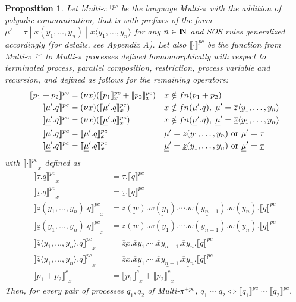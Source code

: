 \documentclass[submission,copyright,creativecommons]{eptcs}
\newcommand{\nat}{{\rm I\!N}}
\newcommand{\restr}[1]{\mbox{$({\bf\nu} #1)$}}
\newcommand{\encoding}[2]{\ensuremath{\llbracket #2 \rrbracket^{#1}}}
\newtheorem{aproposition}[adefinition]{Proposition}
\newenvironment{proposition}{\begin{aproposition}}{\end{aproposition}}
\begin{document}
\begin{proposition} Let Multi-$\pi^{+pc}$ be the language Multi-$\pi$ with the addition
of polyadic communication, that is with prefixes of the form 
$ \mu' = \tau \;|\; x(y_1, \ldots, y_n) \;|\; \overline x \langle y_1, \ldots, y_n \rangle $ for any $n \in \nat$ and SOS rules generalized accordingly (for details, see Appendix A). Let also $\encoding {pc} { \cdot }$ be the function from Multi-$\pi^{+pc}$ to Multi-$\pi$ processes
defined homomorphically with respect to terminated process, parallel composition, restriction, process variable and recursion, and defined as follows for the remaining operators:
\begin{align*}
\encoding {pc} { p_1 + p_2 }  &= \restr x ( \encoding {pc} {p_1} _x + \encoding {pc} {p_2} _x ) & & x \notin fn(p_1 + p_2) \\
\encoding {pc} { \mu'.q }  &= \restr x ( \encoding {pc} {\mu'.q} _x ) & & x \notin fn(\mu'.q) , \; \mu' = \overline z \langle y_1, \ldots, y_n \rangle \\
\encoding {pc} { \underline{\mu}'.q }  &= \restr x ( \encoding {pc} {\underline{\mu}'.q} _x ) & & x \notin fn(\underline{\mu}'.q) , \; \underline{\mu}' = \underline {\overline z} \langle y_1, \ldots, y_n \rangle \\
\encoding {pc} { \mu'.q }  &=  \encoding {pc} {\mu'.q} _{x} & & \mu' =  z(y_1, \ldots, y_n)  \text{ or } \mu' = \tau \\
\encoding {pc} { \underline{\mu}'.q }  &=  \encoding {pc} {\underline{\mu}'.q} _{x} & & \underline{\mu}' =  \underline z (y_1, \ldots, y_n)  \text{ or } \underline{\mu}' = \underline \tau
\end{align*}
with $\encoding {pc} { \cdot }_{x}$ defined as
\begin{align*}
\encoding {pc} { \tau.q }_x  &= \tau.\encoding {pc} q  \\
\encoding {pc} { \underline \tau.q }_x  &= \underline \tau.\encoding {pc} q  \\
\encoding {pc} { z(y_1, \ldots, y_n).q }_x  &= 
\underline{z(w)}.\underline{w(y_1)}. \cdots .\underline{w(y_{n-1})}.w(y_n).\encoding {pc} q \\
\encoding {pc} { \underline z(y_1, \ldots, y_n).q }_x  &= 
\underline{z(w)}.\underline{w(y_1)}. \cdots .\underline{w(y_{n-1})}.\underline{w(y_n)}.\encoding {pc} q \\
\encoding {pc} { \overline z \langle y_1, \ldots, y_n \rangle .q }_x  &= 
\underline{\overline zx}.\underline{\overline xy_1}. \cdots .\underline{\overline xy_{n-1}}.\overline xy_n.\encoding {pc} q \\
\encoding {pc} { \underline {\overline z} \langle y_1, \ldots, y_n \rangle .q }_x  &= 
\underline{\overline zx}.\underline{\overline xy_1}. \cdots .\underline{\overline xy_{n-1}}.\underline{\overline xy_n}.\encoding {pc} q \\
\encoding c { p_1 + p_2 }_x &= \encoding c {p_1}_x + \encoding c {p_2}_x  
\end{align*}
Then, for every pair of processes $q_1, q_2$ of Multi-$\pi^{+pc}$, $q_1 \sim q_2 \iff \encoding {pc} {q_1} \sim \encoding {pc} {q_2} $.
\end{proposition}
\end{document}
